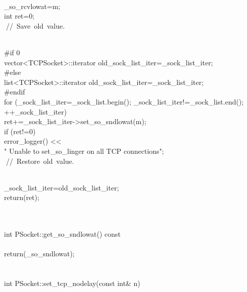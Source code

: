 \documentclass{article}
\begin{document}
 {
\\
     _so_rcvlowat=m;
\\
         int ret=0;
\\
         
\hbox{// Save old value.}\strut\\
 #if 0
\\
         vector<TCPSocket>::iterator old_sock_list_iter=_sock_list_iter;
\\
 #else
\\
         list<TCPSocket>::iterator old_sock_list_iter=_sock_list_iter;
\\
 #endif
\\
     for (_sock_list_iter=_sock_list.begin(); _sock_list_iter!=_sock_list.end();
\\
          ++_sock_list_iter)
\\
         ret+=_sock_list_iter->set_so_sndlowat(m);
\\
     if (ret!=0)
\\
         error_logger() << 
\\
                                 "    Unable to set_so_linger on all TCP connections\n";
\\
         
\hbox{// Restore old value.}\strut\\
         _sock_list_iter=old_sock_list_iter;
\\
     return(ret);
\\
 }
\\
 
\\
 int PSocket::get_so_sndlowat() const
\\
 {
\\
         return(_so_sndlowat);
\\
 }
\\
 
\\
 int PSocket::set_tcp_nodelay(const int& n)
\\
\end{document}
